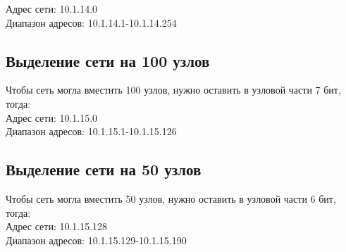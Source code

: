 Адрес сети: 10.1.14.0 \\
Диапазон адресов: 10.1.14.1-10.1.14.254

\subsection{Выделение сети на 100 узлов}
Чтобы сеть могла вместить 100 узлов, нужно оставить в узловой части 7 бит, тогда: \\

Адрес сети: 10.1.15.0 \\
Диапазон адресов: 10.1.15.1-10.1.15.126

\subsection{Выделение сети на 50 узлов}
Чтобы сеть могла вместить 50 узлов, нужно оставить в узловой части 6 бит, тогда: \\

Адрес сети: 10.1.15.128 \\
Диапазон адресов: 10.1.15.129-10.1.15.190
\endinput